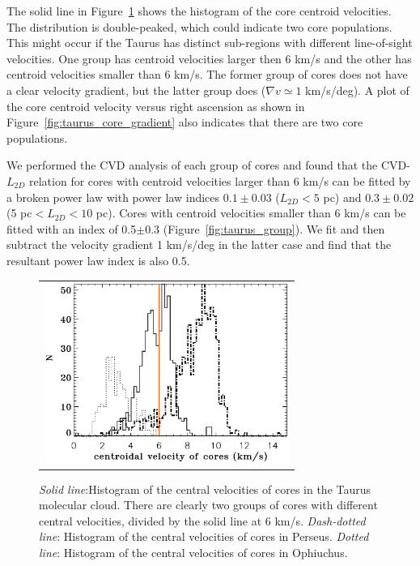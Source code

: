 \documentclass[iop,revtex4]{emulateapj}
\begin{document}
The solid line in Figure~\ref{histvelocity_all} shows the histogram of the core centroid velocities. The distribution is double-peaked, which could indicate two core populations. This might occur if the Taurus has distinct sub-regions with different line-of-sight velocities. One group has centroid velocities larger then 6 km/s and the other has centroid velocities smaller than 6 km/s. The former group of cores does not have a clear velocity gradient, but the latter group does ($\nabla v\simeq 1$ km/s/deg). A plot of the core centroid velocity versus right ascension as shown in Figure~\ref{fig:taurus_core_gradient} also indicates that there are two core populations.

We performed the CVD analysis of each group of cores and found that the CVD-$L_{2D}$ relation for cores with centroid velocities larger than 6 km/s can be fitted by a broken power law with power law indices $0.1\pm 0.03$ ($L_{2D}<5$ pc) and $0.3\pm 0.02$ (5 pc$<L_{2D}<10$ pc).
Cores with centroid velocities smaller than 6 km/s can be fitted with an index of 0.5$\pm$0.3 (Figure~\ref{fig:taurus_group}). We fit and then subtract the velocity gradient 1 km/s/deg in the latter case and find that the resultant power law index is also 0.5.





\begin{figure}[htbp]
\centering
\begin{tabular}{c}
\includegraphics[width=8cm]{histvelocity_all.eps}\\
\end{tabular}
\caption{{\it Solid line}:Histogram of the central velocities of cores in the Taurus molecular cloud. There are clearly two groups of cores with different central velocities, divided by the solid line at 6 km/s. {\it Dash-dotted line}: Histogram of the central velocities of cores in Perseus. {\it Dotted line}: Histogram of the central velocities of cores in Ophiuchus.}\label{histvelocity_all}
\end{figure}
\end{document}
